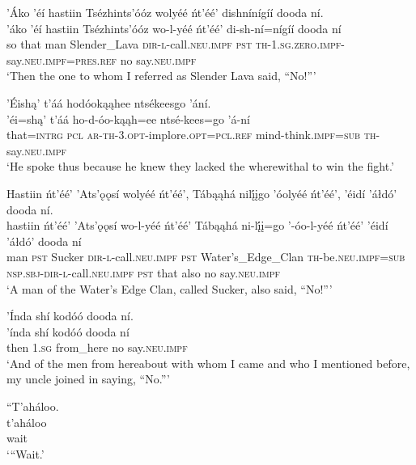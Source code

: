 \ea\label{ex:text1-48-3}
’Áko ’éí hastiin Tsézhints’óóz wolyéé ńt’éé’ dishnínígíí dooda ní.\\
\gll ’áko	’éí	hastiin	Tsézhints’óóz	wo-l-yéé	ńt’éé’	di-sh-ní=nígíí	dooda	ní\\
     so	that	man	Slender\_Lava	\textsc{dir}-\textsc{l}-call.\textsc{neu}.\textsc{impf}	\textsc{pst}	\textsc{th}-1.\textsc{sg}.\textsc{zero}.\textsc{impf}-say.\textsc{neu}.\textsc{impf}=\textsc{pres}.\textsc{ref}	no	say.\textsc{neu}.\textsc{impf}\\
\glt `Then the one to whom I referred as Slender Lava said, ``No!'''
\z

\ea\label{ex:text1-48-4}
’Éishą’ t’áá hodóokąąhee ntsékeesgo ’ání.\\
\gll ’éi=shą’	t’áá	ho-d-óo-kąąh=ee	ntsé-kees=go	’á-ní\\
     that=\textsc{intrg}	\textsc{pcl}	\textsc{ar}-\textsc{th}-3.\textsc{opt}-implore.\textsc{opt}=\textsc{pcl}.\textsc{ref}	mind-think.\textsc{impf}=\textsc{sub}	\textsc{th}-say.\textsc{neu}.\textsc{impf}\\
\glt `He spoke thus because he knew they lacked the wherewithal to win the fight.'
\z

\ea\label{ex:text1-48-5}
Hastiin ńt’éé’ ’Ats’ǫǫsí wolyéé ńt’éé’, Tábąąhá nilį́įgo ’óolyéé ńt’éé’, ’éidí ’áłdó’ dooda ní.\\
\gll hastiin	ńt’éé’	’Ats’ǫǫsí	wo-l-yéé	ńt’éé’	Tábąąhá	ni-lį́į=go	’-óo-l-yéé	ńt’éé’	’éidí	’áłdó’	dooda	ní\\
     man	\textsc{pst}	Sucker	\textsc{dir}-\textsc{l}-call.\textsc{neu}.\textsc{impf}	\textsc{pst}	Water's\_Edge\_Clan	\textsc{th}-be.\textsc{neu}.\textsc{impf}=\textsc{sub}	\textsc{nsp}.\textsc{sbj}-\textsc{dir}-\textsc{l}-call.\textsc{neu}.\textsc{impf}	\textsc{pst}	that	also	no	say.\textsc{neu}.\textsc{impf}\\
\glt `A man of the Water's Edge Clan, called Sucker, also said, ``No!'''
\z

\ea\label{ex:text1-48-6}
’Índa shí kodóó dooda ní.\\
\gll ’índa	shí	kodóó	dooda	ní\\
     then	1.\textsc{sg}	from\_here	no	say.\textsc{neu}.\textsc{impf}\\
\glt `And of the men from hereabout with whom I came and who I mentioned before, my uncle joined in saying, ``No.'''
\z

\ea\label{ex:text1-49-1}
``T’aháloo.\\
\gll t’aháloo\\
     wait\\
\glt `{``}Wait.'
\z

